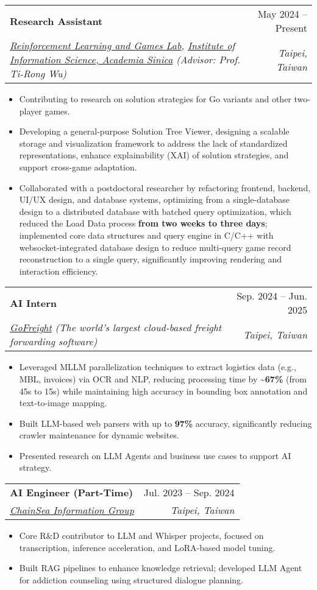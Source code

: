 \documentclass[letterpaper,10pt]{article}
\makeatletter
\newcommand{\resumeItem}[1]{
  \item\small{
    {#1 \vspace{-2pt}}
  }
}
\newcommand{\resumeSubheading}[4]{
  \vspace{-2pt}\item
    \begin{tabular*}{0.97\textwidth}[t]{l@{\extracolsep{\fill}}r}
      \textbf{#1} & #2 \\
      \textit{\small#3} & \textit{\small #4} \\
    \end{tabular*}\vspace{-7pt}
}
\newcommand{\resumeItemListStart}{\begin{itemize}}
\newcommand{\resumeItemListEnd}{\end{itemize}\vspace{-5pt}}
\makeatother
\begin{document}
    \resumeSubheading
      {Research Assistant}{May 2024 -- Present}
      {\href{https://homepage.iis.sinica.edu.tw/pages/tirongwu/index_en.html}{Reinforcement Learning and Games Lab}, \href{https://www.iis.sinica.edu.tw/en/page/AboutUs/Introduction.html}{Institute of Information Science, Academia Sinica} (Advisor: Prof. Ti-Rong Wu)}{Taipei, Taiwan}
      \resumeItemListStart
        \resumeItem{Contributing to research on solution strategies for Go variants and other two-player games.}
        \resumeItem{Developing a general-purpose Solution Tree Viewer, designing a scalable storage and visualization framework to address the lack of standardized representations, enhance explainability (XAI) of solution strategies, and support cross-game adaptation.}
        \resumeItem{Collaborated with a postdoctoral researcher by refactoring frontend, backend, UI/UX design, and database systems, optimizing from a single-database design to a distributed database with batched query optimization, which reduced the Load Data process \textbf{from two weeks to three days}; implemented core data structures and query engine in C/C++ with websocket-integrated database design to reduce multi-query game record reconstruction to a single query, significantly improving rendering and interaction efficiency.}
      \resumeItemListEnd
    
    \resumeSubheading
      {AI Intern}{Sep. 2024 -- Jun. 2025}
      {\href{https://www.gofreight.com/}{GoFreight} (The world's largest cloud-based freight forwarding software)}{Taipei, Taiwan}
        \resumeItemListStart
          \resumeItem{Leveraged MLLM parallelization techniques to extract logistics data (e.g., MBL, invoices) via OCR and NLP, reducing processing time by \textbf{\textasciitilde67\%} (from 45s to 15s) while maintaining high accuracy in bounding box annotation and text-to-image mapping.}
          \resumeItem{Built LLM-based web parsers with up to \textbf{97\%} accuracy, significantly reducing crawler maintenance for dynamic websites.}
          \resumeItem{Presented research on LLM Agents and business use cases to support AI strategy.}
        \resumeItemListEnd

    \resumeSubheading
      {AI Engineer (Part-Time)}{Jul. 2023 -- Sep. 2024}
      {\href{https://www.chainsea.com.tw/about/introduction/}{ChainSea Information Group}}{Taipei, Taiwan}
        \resumeItemListStart
          \resumeItem{Core R\&D contributor to LLM and Whisper projects, focused on transcription, inference acceleration, and LoRA-based model tuning.}
          \resumeItem{Built RAG pipelines to enhance knowledge retrieval; developed LLM Agent for addiction counseling using structured dialogue planning.}
        \resumeItemListEnd
\end{document}
